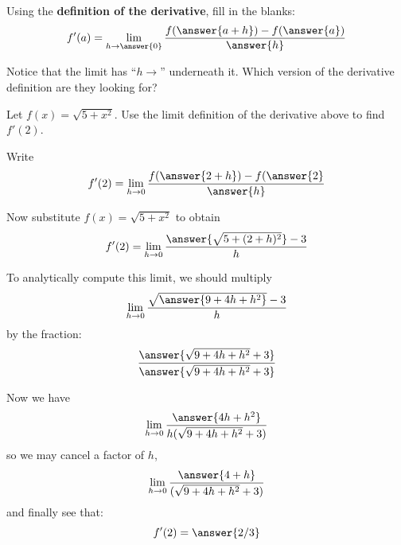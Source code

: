 \documentclass{ximera}
\begin{document}
\begin{exercise}

Using the \textbf{definition of the derivative}, fill in the blanks:
  \[
  f'(a)=
  \lim_{h\to\answer{0}}
  \frac{f(\answer{a+h})-f(\answer{a})}{\answer{h}}
  \]
  \begin{hint}
	Notice that the limit has ``$h \to $'' underneath it.  Which version of the derivative definition are they looking for?
  \end{hint}


\begin{exercise}
  Let $f(x)=\sqrt{5+x^2}$. Use the limit definition of the derivative
  above to find $f'(2)$.  
  \begin{exercise}
    Write
    \[
    f'(2) = \lim_{h\to 0}\frac{f(\answer{2+h}) -f(\answer{2}}{\answer{h}}
    \]
    \begin{exercise}
      Now substitute $f(x) = \sqrt{5+x^2}$ to obtain
      \[
      f'(2) = \lim_{h\to 0} \frac{\answer{\sqrt{5+(2+h)^2}}-3}{h}
      \]
      \begin{exercise}
        To analytically compute this limit, we should multiply
        \[
        \lim_{h\to 0} \frac{\sqrt{\answer{9+4h+h^2}}-3}{h}
        \]
        by the fraction:
        \[
        \frac{\answer{\sqrt{9+4h+h^2}+3}}{\answer{\sqrt{9+4h+h^2}+3}}
        \]
        \begin{exercise}
          Now we have 
          \[
          \lim_{h\to 0} \frac{\answer{4h+h^2}}{h(\sqrt{9+4h+h^2}+3)}
          \]
          so we may cancel a factor of $h$,
          \[
          \lim_{h\to 0} \frac{\answer{4+h}}{(\sqrt{9+4h+h^2}+3)}
          \]
          and finally see that:
          \[
          f'(2) = \answer{2/3}
          \]
        \end{exercise}
      \end{exercise}
    \end{exercise}
  \end{exercise}
\end{exercise}
\end{exercise}
\end{document}
